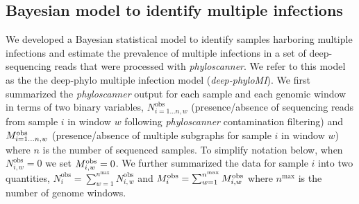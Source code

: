 \documentclass[10pt,letterpaper]{article}
\newcommand{\MI}{M^{\text{\text{obs}}}}
\begin{document}
\subsection{Bayesian model to identify multiple infections}
\label{sec:model_methods}
We developed a Bayesian statistical model to identify samples harboring multiple infections and estimate the prevalence of multiple infections in a set of deep-sequencing reads that were processed with \textit{phyloscanner}. We refer to this model as the  the deep-phylo multiple infection model (\textit{deep-phyloMI}). We first summarized the \textit{phyloscanner} output for each sample and each genomic window in terms of two binary variables, $N^{\text{obs}}_{i=1...n,w}$ (presence/absence of sequencing reads from sample $i$ in window $w$ following \textit{phyloscanner} contamination filtering) and $\MI_{i=1...n,w}$ (presence/absence of multiple subgraphs for sample $i$ in window $w$) where $n$ is the number of sequenced samples. To simplify notation below, when $N^{\text{obs}}_{i,w} = 0$ we set $\MI_{i,w} = 0$. We further summarized the data for sample $i$ into two quantities, $N^{\text{obs}}_{i} = \sum_{w=1}^{n^{\text{max}}} N^{\text{obs}}_{i,w}$ and $\MI_i = \sum_{w=1}^{n^{\text{max}}} \MI_{i,w}$ where ${n^{\text{max}}}$ is the number of genome windows.
\end{document}
